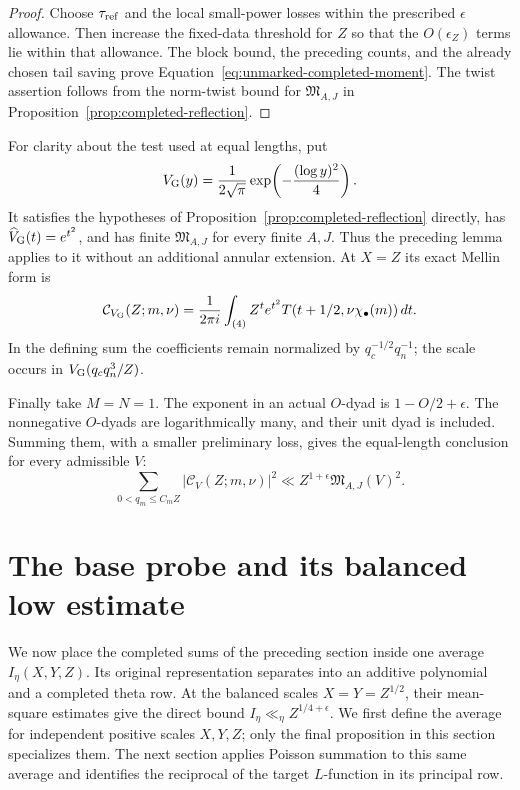 \documentclass[11pt,a4paper]{article}
\numberwithin{equation}{section}
\numberwithin{figure}{section}
\theoremstyle{definition}
\theoremstyle{remark}
\begin{document}
\begin{proof}
Choose $\tau_{\rm ref}$ and the local small-power losses within the prescribed
$\epsilon$ allowance.  Then increase the fixed-data threshold for $Z$ so that
the $O(\epsilon_Z)$ terms lie within that allowance.  The block bound, the
preceding counts, and the already chosen tail saving prove
Equation~\eqref{eq:unmarked-completed-moment}.  The twist assertion follows
from the norm-twist bound for $\mathfrak M_{A,J}$ in
Proposition~\ref{prop:completed-reflection}.
\end{proof}

For clarity about the test used at equal lengths, put
\[
 V_{\rm G}(y)=\frac1{2\sqrt\pi}
           \exp\!\left(-\frac{(\log y)^2}{4}\right).
\]
It satisfies the hypotheses of Proposition~\ref{prop:completed-reflection}
directly, has $\widehat V_{\rm G}(t)=e^{t^2}$, and has finite
$\mathfrak M_{A,J}$ for every finite $A,J$.  Thus the preceding lemma applies
to it without an additional annular extension.  At $X=Z$ its exact Mellin form
is
\[
 \mathcal C_{V_{\rm G}}(Z;m,\nu)=\frac1{2\pi i}\int_{(4)}
       Z^t e^{t^2}T(t+1/2,\nu\chi_\bullet(m))\,dt.
\]
In the defining sum the coefficients remain normalized by
$q_c^{-1/2}q_n^{-1}$; the scale occurs in $V_{\rm G}(q_cq_n^3/Z)$.

Finally take $M=N=1$.  The exponent in an actual $O$-dyad is
$1-O/2+\epsilon$.  The nonnegative $O$-dyads are logarithmically many, and
their unit dyad is included.  Summing them, with a smaller preliminary loss,
gives the equal-length conclusion for every admissible $V$:
\begin{equation}\label{eq:unmarked-balanced-completed-moment}
 \sum_{0<q_m\le C_mZ}|\mathcal C_V(Z;m,\nu)|^2
 \ll Z^{1+\epsilon}\mathfrak M_{A,J}(V)^2.
\end{equation}

\section{The base probe and its balanced low estimate}\label{sec:probe}

We now place the completed sums of the preceding section inside one
average $I_\eta(X,Y,Z)$. Its original representation separates into an
additive polynomial and a completed theta row. At the balanced scales
$X=Y=Z^{1/2}$, their mean-square estimates give the direct bound
$I_\eta\ll_\eta Z^{1/4+\epsilon}$. We first define the average for
independent positive scales $X,Y,Z$; only the final proposition in this
section specializes them. The next section applies Poisson summation to
this same average and identifies the reciprocal of the target
$L$-function in its principal row.
\end{document}
